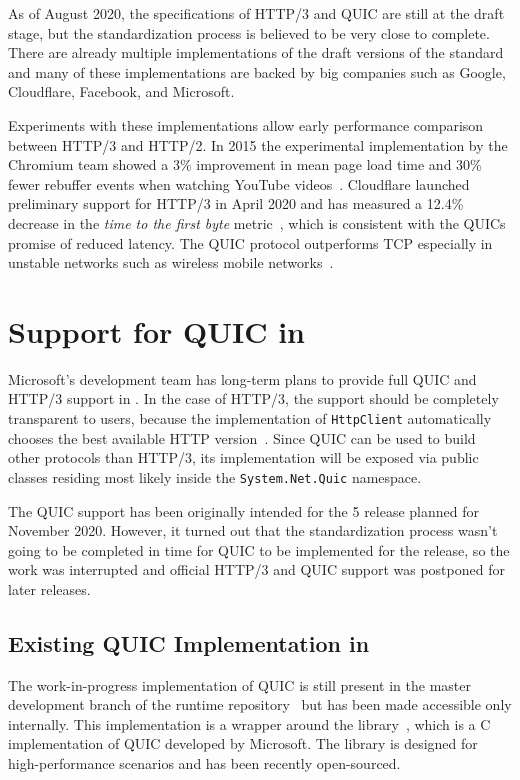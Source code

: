 As of August 2020, the specifications of HTTP/3 and QUIC are still at the draft stage, but the
standardization process is believed to be very close to complete. There are already multiple
implementations of the draft versions of the standard and many of these implementations are backed
by big companies such as Google, Cloudflare, Facebook, and Microsoft.

Experiments with these implementations allow early performance comparison between HTTP/3 and HTTP/2.
In 2015 the experimental implementation by the Chromium team showed a 3\% improvement in mean page
load time and 30\% fewer rebuffer events when watching YouTube videos~\cite{Wilk2015}. Cloudflare
launched preliminary support for HTTP/3 in April 2020 and has measured a 12.4\% decrease in the
\textit{time to the first byte} metric~\cite{Tellakula2020}, which is consistent with the QUICs
promise of reduced latency. The QUIC protocol outperforms TCP especially in unstable networks such
as wireless mobile networks~\cite{Cook2017}.

\section{Support for QUIC in \dotnet{}}

Microsoft's \dotnet{} development team has long-term plans to provide full QUIC and HTTP/3 support
in \dotnet{}. In the case of HTTP/3, the support should be completely transparent to users, because
the implementation of \texttt{HttpClient} automatically chooses the best available HTTP
version~\cite{HttpClientDocs}. Since QUIC can be used to build other protocols than HTTP/3, its
implementation will be exposed via public classes residing most likely inside the
\texttt{System.Net.Quic} namespace.

The QUIC support has been originally intended for the \dotnet{} 5 release planned for November 2020.
However, it turned out that the standardization process wasn't going to be completed in time for
QUIC to be implemented for the release, so the work was interrupted and official HTTP/3 and QUIC
support was postponed for later releases.

\subsection*{Existing QUIC Implementation in \dotnet{}}

The work-in-progress implementation of QUIC is still present in the master development branch of the
\dotnet{} runtime repository~\cite{dotnetGithub} but has been made accessible only internally. This
implementation is a wrapper around the \libmsquic{} library~\cite{msquicGithub}, which is a C
implementation of QUIC developed by Microsoft. The \libmsquic{} library is designed for
high-performance scenarios and has been recently open-sourced.

